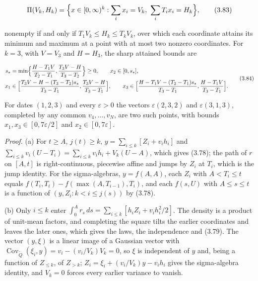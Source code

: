 \documentclass[11pt]{article}
\begin{document}
\begin{equation*}
\Pi(V_k, H_k) = \Bigl\{ x \in [0, \infty)^k : \sum_i x_i = V_k,\ \sum_i T_i x_i = H_k \Bigr\}, \tag{3.83}\label{eq:3.83}
\end{equation*}

nonempty if and only if \(T_1 V_k \le H_k \le T_k V_k\), over which each coordinate attains its minimum and maximum at a point with at most two nonzero coordinates. For \(k = 3\), with \(V = V_3\) and \(H = H_3\), the sharp attained bounds are

\begin{equation*}
\begin{aligned}
s_* &= \min\Bigl\{ \frac{H - T_1 V}{T_2 - T_1}, \frac{T_3 V - H}{T_3 - T_2} \Bigr\} \ge 0, \qquad x_2 \in [0, s_*], \\
x_1 &\in \Bigl[ \frac{T_3 V - H - (T_3 - T_2) s_*}{T_3 - T_1}, \frac{T_3 V - H}{T_3 - T_1} \Bigr], \qquad
x_3 \in \Bigl[ \frac{H - T_1 V - (T_2 - T_1) s_*}{T_3 - T_1}, \frac{H - T_1 V}{T_3 - T_1} \Bigr].
\end{aligned} \tag{3.84}\label{eq:3.84}
\end{equation*}

For dates \((1, 2, 3)\) and every \(\varepsilon > 0\) the vectors \(\varepsilon(2, 3, 2)\) and \(\varepsilon(3, 1, 3)\), completed by any common \(v_4, \dots, v_N\), are two such points, with bounds \(x_1, x_3 \in [0, 7\varepsilon/2]\) and \(x_2 \in [0, 7\varepsilon]\).

\emph{Proof.} (a) For \(t \ge A\), \(j(t) \ge k\), \(y = \sum_{i \le k} [Z_i + v_i h_i]\) and \(\sum_{i \le k} v_i (U - T_i) = \sum_{i \le k} v_i h_i + V_k (U - A)\), which gives (3.78); the path of \(r\) on \([A, t]\) is right-continuous, piecewise affine and jumps by \(Z_i\) at \(T_i\), which is the jump identity. For the sigma-algebras, \(y = f(A, A)\), each \(Z_i\) with \(A < T_i \le t\) equals \(f(T_i, T_i) - f(\max(A, T_{i-1}), T_i)\), and each \(f(s, U)\) with \(A \le s \le t\) is a function of \((y, Z_i : k < i \le j(s))\) by (3.78).

(b) Only \(i \le k\) enter \(\int_0^A r_s\,ds = \sum_{i \le k} [h_i Z_i + v_i h_i^2 / 2]\). The density is a product of unit-mean factors, and completing the square tilts the earlier coordinates and leaves the later ones, which gives the laws, the independence and (3.79). The vector \((y, \xi)\) is a linear image of a Gaussian vector with \(\operatorname{Cov}_{\tilde Q}(\xi_i, y) = v_i - (v_i / V_k) V_k = 0\), so \(\xi\) is independent of \(y\) and, being a function of \(Z_{\le k}\), of \(Z_{>k}\); \(Z_i = \xi_i + (v_i / V_k) y - v_i h_i\) gives the sigma-algebra identity, and \(V_k = 0\) forces every earlier variance to vanish.
\end{document}
